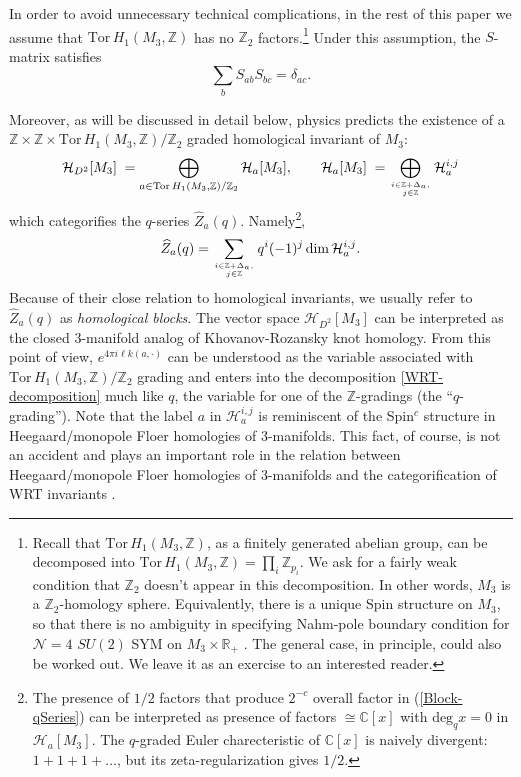 \documentclass[hyper,letterpaper]{JHEP3}
\newcommand{\Z}{{\mathbb Z}}
\newcommand{\R}{{\mathbb R}}
\newcommand{\C}{{\mathbb C}}
\renewcommand{\hat}{\widehat}
\def\CH{{\mathcal H}}
\def\CN{{\mathcal N}}
\def\lk{{\ell k}}
\def\Tor{{\mathrm{Tor}\,}}
\begin{document}
In order to avoid unnecessary technical complications, in the rest of this paper
we assume that $\Tor H_1(M_3,\Z)$ has no $\Z_2$ factors.\footnote{Recall that $\Tor H_1(M_3,\Z)$, as a finitely generated abelian group, can be decomposed into $\Tor H_1(M_3,\Z)= \prod_{i}\Z_{p_i}$. We ask for a fairly weak condition that $\Z_2$ doesn't appear in this decomposition. In other words, $M_3$ is a $\Z_2$-homology sphere. Equivalently, there is a unique Spin structure on $M_3$, so that there is no ambiguity in specifying Nahm-pole boundary condition for $\CN=4$ $SU(2)$ SYM on $M_3\times\R_+$ \cite{Witten:2011zz}. The general case, in principle, could also be worked out. We leave it as an exercise to an interested reader.} Under this assumption, the $S$-matrix satisfies
\begin{equation}
	\sum_{b}S_{ab}S_{bc}=\delta_{ac}.
\label{S-squared}
\end{equation}

Moreover, as will be discussed in detail below, physics predicts the existence of a $\Z \times \Z \times \Tor H_1(M_3,\Z)/\Z_2$ graded homological invariant of $M_3$:
\begin{equation}
	\CH_{D^2}[M_3] \; =\bigoplus_{a\in \Tor H_1(M_3,\Z)/\Z_2}\CH_a[M_3],\qquad \CH_a[M_3] \; =\bigoplus_{i\in \Z+\Delta_a,\atop j\in\Z}\CH^{i,j}_a
\end{equation}
 which categorifies the $q$-series $\hat{Z}_a(q)$. Namely\footnote{ The presence of $1/2$ factors that produce $2^{-c}$ overall factor in (\ref{Block-qSeries}) can be interpreted as presence of factors $\cong \C[x]$ with $\text{deg}_qx=0$ in $\CH_a[M_3]$. The $q$-graded Euler charecteristic of $\C[x]$ is naively divergent: $1+1+1+\ldots$, but its zeta-regularization gives $1/2$. },
\begin{equation}
	\hat{Z}_a(q)=\sum_{i\in \Z+\Delta_a,\atop j\in\Z}q^{i}(-1)^j\dim\CH^{i,j}_a.
	\label{BlockEuler}
\end{equation}
Because of their close relation to homological invariants, we usually refer to $\hat{Z}_a(q)$ as \textit{homological blocks}. The vector space $\CH_{D^2}[M_3]$ can be interpreted as the closed 3-manifold analog of Khovanov-Rozansky knot homology. From this point of view, $e^{4\pi i\lk(a,\cdot)}$ can be understood as the variable associated with $\Tor H_1(M_3,\Z)/\Z_2$ grading and enters into the decomposition \eqref{WRT-decomposition} much like $q$, the variable for one of the $\Z$-gradings (the ``$q$-grading'').
Note that the label $a$ in $\CH^{i,j}_a$ is reminiscent of the Spin$^c$ structure in Heegaard/monopole Floer homologies of 3-manifolds.
This fact, of course, is not an accident and plays an important role in the relation between Heegaard/monopole Floer homologies of 3-manifolds
and the categorification of WRT invariants \cite{Gukov:2016gkn}.
\end{document}
